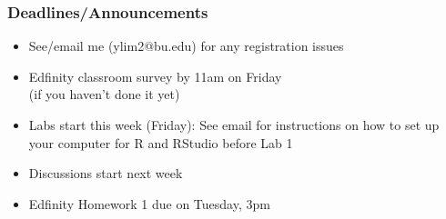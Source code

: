 
\begin{frame}
    \frametitle{Deadlines/Announcements}
\begin{itemize}
            \item See/email me (ylim2@bu.edu) for any registration issues
            \item Edfinity classroom survey by 11am on Friday \\
            (if you haven't done it yet)
            \item Labs start this week (Friday): See email for instructions on how to set up your computer for R and RStudio before Lab 1
            \item Discussions start next week
            \item Edfinity Homework 1 due on Tuesday, 3pm
        \end{itemize}
\end{frame}
